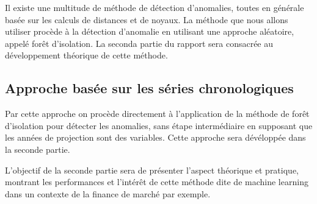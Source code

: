 Il existe une multitude de méthode de détection d'anomalies, toutes en générale basée sur les calculs de distances et de noyaux. La méthode que nous allons utiliser procède à la détection d'anomalie en utilisant une approche aléatoire, appelé forêt d'isolation. La seconda partie du rapport sera consacrée au développement théorique de cette méthode.

\subsection{Approche basée sur les séries chronologiques}

Par cette approche on procède directement à l'application de la méthode de forêt d'isolation pour détecter les anomalies, sans étape intermédiaire en supposant que les années de projection sont des variables. Cette approche sera dévéloppée dans la seconde partie.

L'objectif de la seconde partie sera de présenter l'aspect théorique et pratique, montrant les performances et l'intérêt de cette méthode dite de machine learning dans un contexte de la finance de marché par exemple.


